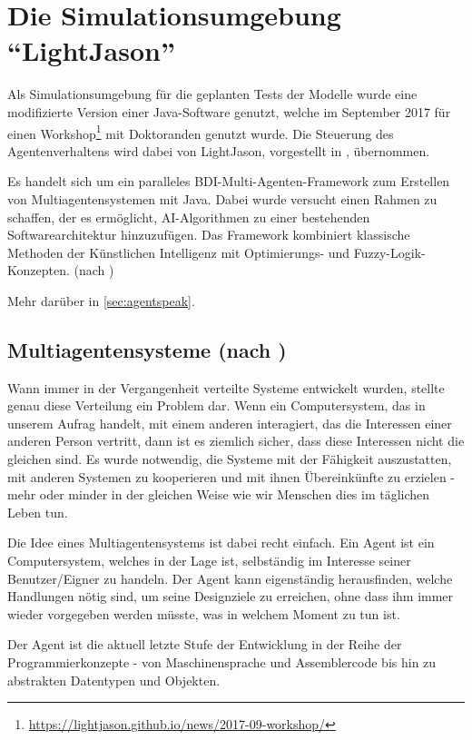 \section{Die Simulationsumgebung \enquote{LightJason}}
\label{simulationsumgebung}

Als Simulationsumgebung für die geplanten Tests der Modelle wurde eine modifizierte Version einer Java-Software genutzt, welche im September 2017 für einen Workshop\footnote{\url{https://lightjason.github.io/news/2017-09-workshop/}} mit Doktoranden genutzt wurde.
Die Steuerung des Agentenverhaltens wird dabei von LightJason, vorgestellt in \cite{lightjason}, übernommen.

Es handelt sich um ein paralleles BDI-Multi-Agenten-Framework zum Erstellen von Multiagentensystemen mit Java. 
Dabei wurde versucht einen Rahmen zu schaffen, der es ermöglicht, AI-Algorithmen zu einer bestehenden Softwarearchitektur hinzuzufügen. 
Das Framework kombiniert klassische Methoden der Künstlichen Intelligenz mit Optimierungs- und Fuzzy-Logik-Konzepten.
(nach \cite{lightjason-web})

Mehr darüber in \cref{sec:agentspeak}.

\subsection[Multiagentensysteme]{Multiagentensysteme (nach \cite{multiagent})}
\label{multiagentensysteme}

Wann immer in der Vergangenheit verteilte Systeme entwickelt wurden, stellte genau diese Verteilung ein Problem dar. 
Wenn ein Computersystem, das in unserem Aufrag handelt, mit einem anderen interagiert, das die Interessen einer anderen Person vertritt, dann ist es ziemlich sicher, dass diese Interessen nicht die gleichen sind.
Es wurde notwendig, die Systeme mit der Fähigkeit auszustatten, mit anderen Systemen zu kooperieren und mit ihnen Übereinkünfte zu erzielen - mehr oder minder in der gleichen Weise wie wir Menschen dies im täglichen Leben tun.

Die Idee eines Multiagentensystems ist dabei recht einfach.
Ein Agent ist ein Computersystem, welches in der Lage ist, selbständig im Interesse seiner Benutzer/Eigner zu handeln.
Der Agent kann eigenständig herausfinden, welche Handlungen nötig sind, um seine Designziele zu erreichen, ohne dass ihm immer wieder vorgegeben werden müsste, was in welchem Moment zu tun ist.

Der Agent ist die aktuell letzte Stufe der Entwicklung in der Reihe der Programmierkonzepte - von Maschinensprache und Assemblercode bis hin zu abstrakten Datentypen und Objekten.

